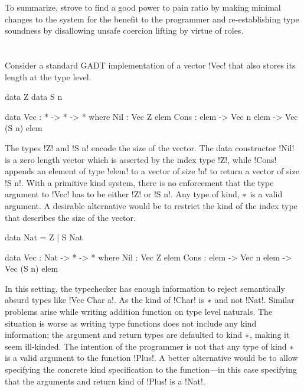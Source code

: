 \documentclass[screen,nonacm,manuscript,review]{acmart} %
\begin{document}
To summarize, \SFR strove to find a good power to pain ratio by making minimal changes to the system for the benefit to the programmer and re-establishing type soundness by disallowing unsafe coercion lifting by virtue of roles.

\section{\SFP}\label{sec:sfp} %
Consider a standard GADT implementation of a vector !Vec! that also stores its length at the type level.

\begin{minipage}[ht]{0.4\linewidth}
\begin{code}
        data Z
        data S n
\end{code}
\end{minipage}%
\begin{minipage}[ht]{0.4\linewidth}
\begin{code}
    data Vec : * -> * -> * where
       Nil : Vec Z elem
       Cons : elem -> Vec n elem -> Vec (S n) elem
\end{code}
\end{minipage}

The types !Z! and !S n! encode the size of the vector. The data
constructor !Nil! is a zero length vector which is asserted by the
index type !Z!, while !Cons! appends an element of type !elem! to a
vector of size !n! to return a vector of size !S n!. With a primitive
kind system, there is no enforcement that the type argument to !Vec!
has to be either !Z! or !S n!. Any type of kind, $\ast$ is a valid
argument. A desirable alternative would be to restrict the kind
of the index type that describes the size of the vector.

\begin{minipage}[ht]{0.4\linewidth}
\begin{code}
         data Nat = Z | S Nat
\end{code}
\end{minipage}%
\begin{minipage}[ht]{0.4\linewidth}
\begin{code}
     data Vec : Nat -> * -> * where
        Nil : Vec Z elem
        Cons : elem -> Vec n elem -> Vec (S n) elem
\end{code}
\end{minipage}

In this setting, the typechecker has enough information to reject
semantically absurd types like !Vec Char a!. As the kind of !Char! is
$\ast$ and not !Nat!. Similar problems arise while writing addition function on type level
naturals. The situation is worse as writing type functions does not
include any kind information; the argument and return types are
defaulted to kind $\ast$, making it seem ill-kinded. The intention of
the programmer is not that any type of kind $\ast$ is a valid
argument to the function !Plus!. A better alternative would be to
allow specifying the concrete kind specification to the function---in
this case specifying that the arguments and return kind of !Plus! is a
!Nat!.
\end{document}
